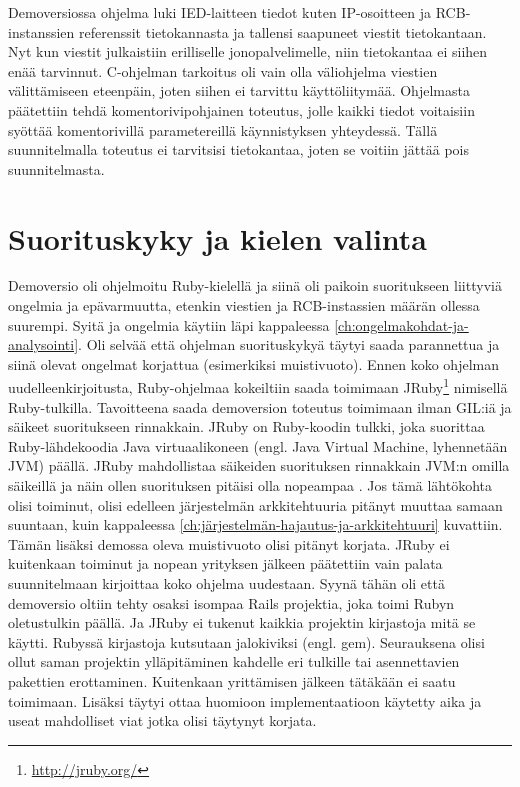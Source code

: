 Demoversiossa ohjelma luki IED-laitteen tiedot kuten IP-osoitteen ja RCB-instanssien referenssit tietokannasta ja tallensi saapuneet viestit tietokantaan. Nyt kun viestit julkaistiin erilliselle jonopalvelimelle, niin tietokantaa ei siihen enää tarvinnut. C-ohjelman tarkoitus oli vain olla väliohjelma viestien välittämiseen eteenpäin, joten siihen ei tarvittu käyttöliitymää. Ohjelmasta päätettiin tehdä komentorivipohjainen toteutus, jolle kaikki tiedot voitaisiin syöttää komentorivillä parametereillä käynnistyksen yhteydessä. Tällä suunnitelmalla toteutus ei tarvitsisi tietokantaa, joten se voitiin jättää pois suunnitelmasta.


\section{Suorituskyky ja kielen valinta}
Demoversio oli ohjelmoitu Ruby-kielellä ja siinä oli paikoin suoritukseen liittyviä ongelmia ja epävarmuutta, etenkin viestien ja RCB-instassien määrän ollessa suurempi. Syitä ja ongelmia käytiin läpi kappaleessa \ref{ch:ongelmakohdat-ja-analysointi}. Oli selvää että ohjelman suorituskykyä täytyi saada parannettua ja siinä olevat ongelmat korjattua (esimerkiksi muistivuoto). Ennen koko ohjelman uudelleenkirjoitusta, Ruby-ohjelmaa kokeiltiin saada toimimaan JRuby\footnote{\url{http://jruby.org/}} nimisellä Ruby-tulkilla. Tavoitteena saada demoversion toteutus toimimaan ilman GIL:iä ja säikeet suoritukseen rinnakkain. JRuby on Ruby-koodin tulkki, joka suorittaa Ruby-lähdekoodia Java virtuaalikoneen (engl. Java Virtual Machine, lyhennetään JVM) päällä. JRuby mahdollistaa säikeiden suorituksen rinnakkain JVM:n omilla säikeillä ja näin ollen suorituksen pitäisi olla nopeampaa \mbox{\cite{Youssef2013}}. Jos tämä lähtökohta olisi toiminut, olisi edelleen järjestelmän arkkitehtuuria pitänyt muuttaa samaan suuntaan, kuin kappaleessa \ref{ch:järjestelmän-hajautus-ja-arkkitehtuuri} kuvattiin. Tämän lisäksi demossa oleva muistivuoto olisi pitänyt korjata. JRuby ei kuitenkaan toiminut ja nopean yrityksen jälkeen päätettiin vain palata suunnitelmaan kirjoittaa koko ohjelma uudestaan. Syynä tähän oli että demoversio oltiin tehty osaksi isompaa Rails projektia, joka toimi Rubyn oletustulkin päällä. Ja JRuby ei tukenut kaikkia projektin kirjastoja mitä se käytti. Rubyssä kirjastoja kutsutaan jalokiviksi (engl. gem). Seurauksena olisi ollut saman projektin ylläpitäminen kahdelle eri tulkille tai asennettavien pakettien erottaminen. Kuitenkaan yrittämisen jälkeen tätäkään ei saatu toimimaan. Lisäksi täytyi ottaa huomioon implementaatioon käytetty aika ja useat mahdolliset viat jotka olisi täytynyt korjata.

